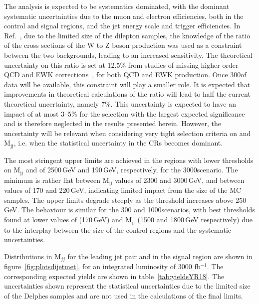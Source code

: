 \documentclass[../report.tex]{subfiles}
\begin{document}
The analysis is expected to be systematics dominated, with the
dominant systematic uncertainties due to the muon and electron
efficiencies, both in the control and signal regions, and the jet
energy scale and trigger efficiencies. In
Ref.~\cite{Sirunyan:2018owy}, due to the limited size of the dilepton
samples, the knowledge of the ratio of the cross sections of the W to
Z boson production was used as a constraint between the two
backgrounds, leading to an increased sensitivity. The theoretical
uncertainty on this ratio is set at 12.5\% from studies of missing
higher order QCD and EWK corrections~\cite{Sirunyan:2018owy}, for both
QCD and EWK production. Once 300\fbinv of data will be available, this
constraint will play a smaller role. It is expected that improvements
in theoretical calculations of the ratio will lead to half the current
theoretical uncertainty, namely 7\%.  This uncertainty is expected to
have an impact of at most 3--5\% for the selection with the largest
expected significance and is therefore neglected in the results
presented herein. However, the uncertainty will be relevant when
considering very tight selection criteria on \MET and M$_{\text{jj}}$,
i.e. when the statistical uncertainty in the CRs becomes dominant.


The most stringent upper limits are achieved in the regions with lower
thresholds on M$_{\text{jj}}$ and \MET of 2500\,GeV and 190\,GeV,
respectively, for the 3000\fbinv scenario. The minimum is rather flat
between M$_{\text{jj}}$ values of 2300 and 3000\,GeV, and between
\MET values of 170 and 220\,GeV, indicating limited impact from the size of the MC
samples. The upper limits degrade steeply as the \MET threshold
increases above 250\,GeV. The behaviour is similar for the 300 and
1000\fbinv scenarios, with best thresholds found at lower values
of \MET (170\,GeV) and M$_{\text{jj}}$ (1500 and 1800\,GeV respectively)
due to the interplay between the size of the control regions and the
systematic uncertainties.

Distributions in M$_{jj}$ for
the leading jet pair and \MET in the signal region are shown in
figure~\ref{fig:plotsdijetmet}, for an integrated luminosity of 3000 fb$^{-1}$. The
corresponding expected yields are shown in
table~\ref{tab:yieldsYR18}. The uncertainties shown represent the statistical 
uncertainties due to the limited size of the Delphes samples and are not used in the calculations
of the final limits.
\end{document}
